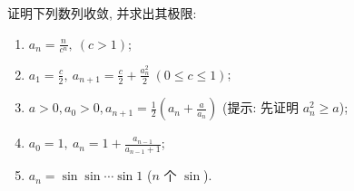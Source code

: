 \begin{exercise}[1.2.18]
    证明下列数列收敛, 并求出其极限:
    \begin{enumerate}[(1)]
        \item $a_n = \frac{n}{c^n}, \ (c>1)$;
        \item $a_1 = \frac{c}{2}, \ a_{n+1} = \frac{c}{2} + \frac{a_n^2}{2} \ (0 \le c \le 1)$;
        \item $a > 0, a_0 > 0, a_{n+1} = \frac{1}{2} \left(a_n + \frac{a}{a_n}\right)$ (提示: 先证明 $a_n^2 \ge a$);
        \item $a_0 = 1, \ a_n = 1 + \frac{a_{n-1}}{a_{n-1} + 1}$;
        \item $a_n = \sin \sin \cdots \sin 1$ ($n$ 个 $\sin$).
    \end{enumerate}
\end{exercise}

